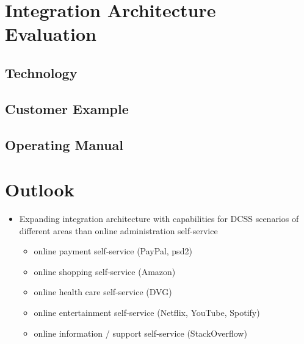 \documentclass[
     12pt,         %
     a4paper,      %
     BCOR=10mm,version=first,     %
     DIV=14,version=first,        %
     ]{scrreprt}
\begin{document}
\chapter{Integration Architecture Evaluation}

\section{Technology}

\section{Customer Example}

\section{Operating Manual}

\chapter{Outlook}

\begin{itemize}
     \item Expanding integration architecture with capabilities for DCSS scenarios of different areas than online administration self-service
     \begin{itemize}
          \item online payment self-service (PayPal, psd2)
          \item online shopping self-service (Amazon)
          \item online health care self-service (DVG)
          \item online entertainment self-service (Netflix, YouTube, Spotify)
          \item online information / support self-service (StackOverflow)
     \end{itemize}
\end{itemize}

\printbibliography
\end{document}
